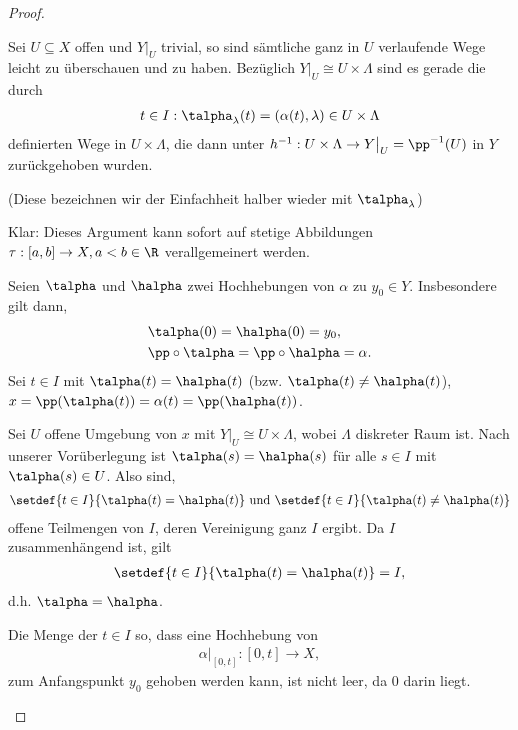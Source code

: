\begin{proof}
\begin{bemn}[Vorüberlegung.]
Sei $U\subseteq X$ offen und $Y\big|_U$ trivial, so sind sämtliche ganz in $U$
verlaufende Wege leicht zu überschauen und zu haben. Bezüglich $Y\big|_U\cong
U\times\Lambda$ sind es gerade die durch
\begin{align*}
t\in I: \talpha_\lambda(t) = (\alpha(t),\lambda)\in U\times\Lambda
\end{align*} 
definierten Wege in $U\times\Lambda$, die dann unter $h^{-1}: U\times \Lambda
\to Y\big|_U = \pp^{-1}(U)$ in $Y$ zurückgehoben wurden.

(Diese bezeichnen wir der Einfachheit halber wieder mit $\talpha_\lambda$)

Klar: Dieses Argument kann sofort auf stetige Abbildungen $\tau:[a,b]\to X,
a<b\in\R$ verallgemeinert werden.
\end{bemn}
\begin{bemn}[Eindeutigkeit.]
Seien $\talpha$ und $\halpha$ zwei Hochhebungen von $\alpha$ zu $y_0\in Y$. 
Insbesondere gilt dann,
\begin{align*}
&\talpha(0) = \halpha(0) = y_0,\\
&\pp\circ\talpha = \pp\circ\halpha = \alpha. 
\end{align*}
Sei $t\in I$ mit $\talpha(t) = \halpha(t)$ (bzw. $\talpha(t)\neq\halpha(t)$),
$x=\pp(\talpha(t)) = \alpha(t) = \pp(\halpha(t))$.

Sei $U$ offene Umgebung von $x$ mit $Y\big|_U \cong U\times\Lambda$, wobei
$\Lambda$ diskreter Raum ist. Nach unserer Vorüberlegung ist $\talpha(s) =
\halpha(s)$ für alle $s\in I$ mit $\talpha(s)\in U$. Also sind,
\begin{align*}
\setdef{t\in I}{\talpha(t) = \halpha(t)}  \text{ und }
\setdef{t\in I}{\talpha(t)\neq\halpha(t)}
\end{align*}
offene Teilmengen von $I$, deren Vereinigung ganz $I$ ergibt. Da $I$
zusammenhängend ist, gilt
\begin{align*}
\setdef{t\in I}{\talpha(t) = \halpha(t)} = I,
\end{align*}
d.h. $\talpha=\halpha$.
\end{bemn}

\begin{bemn}[Existenz.]
Die Menge der $t\in I$ so, dass eine Hochhebung von
\begin{align*}
\alpha\big|_{[0,t]}: [0,t]\to X, 
\end{align*}
zum Anfangspunkt $y_0$ gehoben werden kann, ist nicht leer, da $0$
darin liegt.


\end{bemn}
\end{proof}
